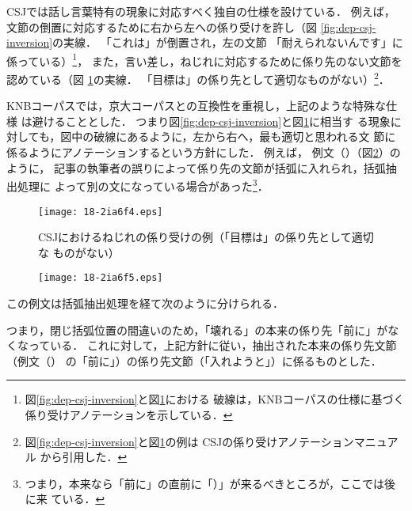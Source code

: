 \documentclass[japanese]{jnlp_JS2.0}
\begin{document}
CSJでは話し言葉特有の現象に対応すべく独自の仕様を設けている．
例えば，文節の倒置に対応するために右から左への係り受けを許し（図
\ref{fig:dep-csj-inversion}の実線．
「これは」が倒置され，左の文節
「耐えられないんです」に 係っている）\inhibitglue\footnote{図\ref{fig:dep-csj-inversion}と図\ref{fig:dep-csj-nejire}における
破線は，KNBコーパスの仕様に基づく係り受けアノテーションを示している．
}，
また，言い差し，ねじれに対応するために係り先のない文節を認めている（図
\ref{fig:dep-csj-nejire}の実線．
「目標は」の係り先として適切なものがない）\inhibitglue\footnote{
図\ref{fig:dep-csj-inversion}と図\ref{fig:dep-csj-nejire}の例は
CSJの係り受けアノテーションマニュアル
\cite{CSJ:係り受けマニュアル}
から引用した．
}．

KNBコーパスでは，京大コーパスとの互換性を重視し，上記のような特殊な仕様
は避けることとした．
つまり図\ref{fig:dep-csj-inversion}と図\ref{fig:dep-csj-nejire}に相当す
る現象に対しても，図中の破線にあるように，左から右へ，最も適切と思われる文
節に係るようにアノテーションするという方針にした．
例えば，
例文（）（図\ref{fig:dep-knb-nejire}）のように，
記事の執筆者の誤りによって係り先の文節が括弧に入れられ，括弧抽出処理に
よって別の文になっている場合があった\footnote{
つまり，本来なら「前に」の直前に「）」が来るべきところが，ここでは後に来
ている．
}．



\begin{figure}[t]
\begin{center}
\texttt{[image: 18-2ia6f4.eps]}
\end{center}
\caption{CSJにおけるねじれの係り受けの例（「目標は」の係り先として適切な
 ものがない）}
\label{fig:dep-csj-nejire}
\end{figure}
\begin{figure}[t]
\begin{center}
\texttt{[image: 18-2ia6f5.eps]}
\end{center}
\label{fig:dep-knb-nejire}
\end{figure}

この例文は括弧抽出処理を経て次のように分けられる．


つまり，閉じ括弧位置の間違いのため，「壊れる」の本来の係り先「前に」がな
くなっている．
これに対して，上記方針に従い，抽出された本来の係り先文節（例文（）
の「前に」）の係り先文節（「入れようと」）に係るものとした．
\end{document}
